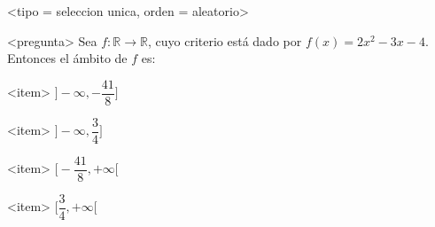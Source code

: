 <tipo = seleccion unica, orden = aleatorio>

<pregunta>
Sea $f:\mathbb R \to \mathbb R$, cuyo criterio est\'a dado por $f(x) = 2x^2 -3x -4$. Entonces el \'ambito de $f$ es:


<item>
$\bigg]{-}\infty, -\dfrac{41}{8}\bigg]$

<item>
$\bigg]{-}\infty, \dfrac{3}{4}\bigg]$

<item>
$\bigg[-\dfrac{41}{8}, +\infty\bigg[$

<item>
$\bigg[\dfrac{3}{4}, +\infty\bigg[$



